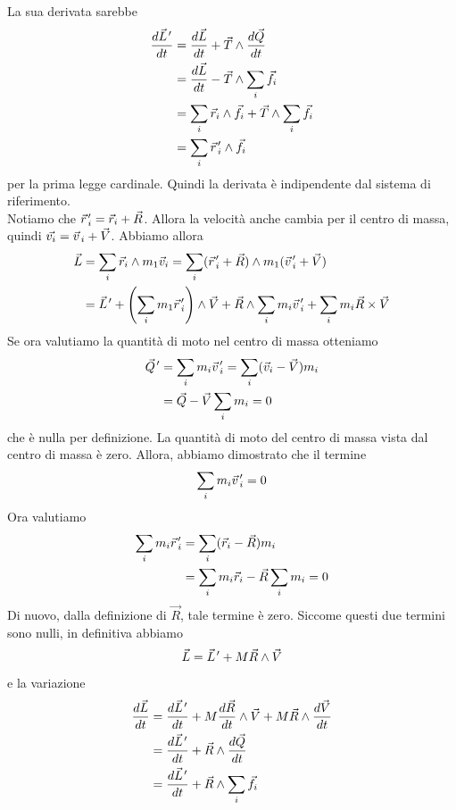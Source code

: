 \documentclass[a4paper]{article}
\begin{document}
La sua derivata sarebbe
\begin{align*}
    \frac{d\pvec{L}'}{dt} &= \frac{d\vec{L}}{dt} + \vec{T} \wedge \frac{d\vec{Q}}{dt} \\
    &= \frac{d\vec{L}}{dt} - \vec{T} \wedge \sum_i \vec{f}_i \\
    &= \sum_i \vec{r}_i \wedge \vec{f}_i + \vec{T} \wedge \sum_i \vec{f}_i \\
    &= \sum_i \pvec{r}_i' \wedge \vec{f}_i
\end{align*}
per la prima legge cardinale. Quindi la derivata è indipendente dal sistema di riferimento.
\\ Notiamo che \(\pvec{r}_i' = \vec{r}_i + \vec{R}\).
Allora la velocità anche cambia per il centro di massa, quindi
\(\vec{v_i} = \pvec{v}_i + \vec{V}\).
Abbiamo allora
\begin{align*}
    \vec{L} &= \sum_i \vec{r}_i \wedge m_1\vec{v}_i = \sum_i (\pvec{r}_i' + \vec{R}) \wedge m_1 (\pvec{v}_i' + \vec{V}) \\
    &= \pvec{L}' + \left(
        \sum_i m_1 \pvec{r}_i'
    \right) \wedge \vec{V} + \vec{R} \wedge
    \sum_i m_i \pvec{v}_i' + \sum_i m_i \vec{R} \times \vec{V}
\end{align*}
Se ora valutiamo la quantità di moto nel centro di massa otteniamo
\begin{align*}
    \pvec{Q}' &= \sum_i m_i \pvec{v}_i' = \sum_i (\vec{v}_i - \vec{V})m_i \\
    &= \vec{Q} - \vec{V} \sum_i m_i = 0
\end{align*}
che è nulla per definizione. La quantità di moto del centro di massa vista dal centro di massa è zero.
Allora, abbiamo dimostrato che il termine
\[
    \sum_i m_i \pvec{v}_i' = 0
\]
Ora valutiamo
\begin{align*}
    \sum_i m_i \pvec{r}_i' &= \sum_i (\vec{r}_i - \vec{R}) m_i \\
    &= \sum_i m_i\vec{r}_i - \vec{R} \sum_i m_i = 0
\end{align*}
Di nuovo, dalla definizione di \(\vec{R}\), tale termine è zero.
Siccome questi due termini sono nulli, in definitiva abbiamo
\[
    \vec{L} = \pvec{L}' + M\vec{R} \wedge \vec{V}
\]
e la variazione
\begin{align*}
    \frac{d\vec{L}}{dt} &= \frac{d\pvec{L}'}{dt} + M\frac{d\vec{R}}{dt} \wedge \vec{V}
    + M \vec{R} \wedge \frac{d\vec{V}}{dt} \\
    &= \frac{d\pvec{L}'}{dt} + \vec{R} \wedge \frac{d\vec{Q}}{dt} \\
    &= \frac{d\pvec{L}'}{dt} + \vec{R} \wedge \sum_i \vec{f}_i
\end{align*}
\end{document}
